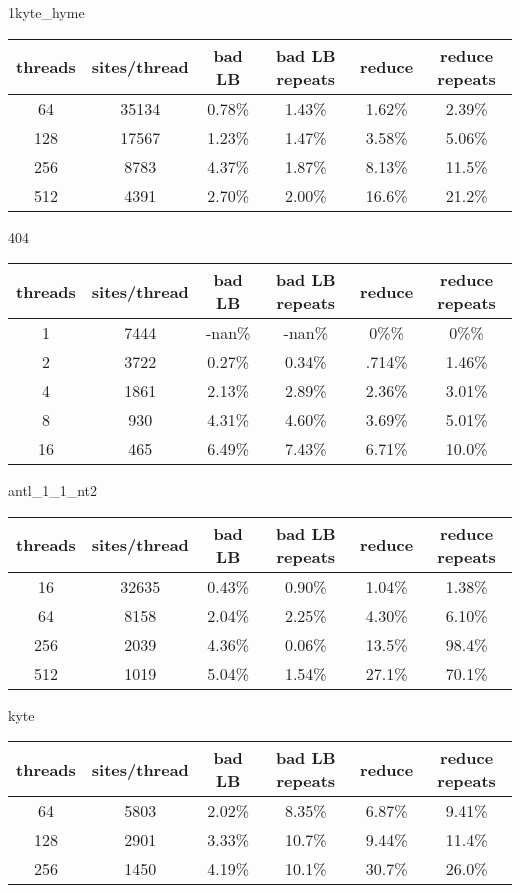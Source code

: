 \documentclass[a4paper]{article}
\begin{document}
1kyte\_hyme

\begin{tabular}{|c|c|c|c|c|c|}
\hline threads & sites/thread & bad LB & bad LB repeats & reduce & reduce repeats \\
\hline 64 & 35134 & 0.78\% & 1.43\% & 1.62\% & 2.39\% \\
\hline 128 & 17567 & 1.23\% & 1.47\% & 3.58\% & 5.06\% \\
\hline 256 & 8783 & 4.37\% & 1.87\% & 8.13\% & 11.5\% \\
\hline 512 & 4391 & 2.70\% & 2.00\% & 16.6\% & 21.2\% \\
\hline
\end{tabular}
\newline

404

\begin{tabular}{|c|c|c|c|c|c|}
\hline threads & sites/thread & bad LB & bad LB repeats & reduce & reduce repeats \\
\hline 1 & 7444 & -nan\% & -nan\% & 0\%\% & 0\%\% \\
\hline 2 & 3722 & 0.27\% & 0.34\% & .714\% & 1.46\% \\
\hline 4 & 1861 & 2.13\% & 2.89\% & 2.36\% & 3.01\% \\
\hline 8 & 930 & 4.31\% & 4.60\% & 3.69\% & 5.01\% \\
\hline 16 & 465 & 6.49\% & 7.43\% & 6.71\% & 10.0\% \\
\hline
\end{tabular}
\newline

antl\_1\_1\_nt2

\begin{tabular}{|c|c|c|c|c|c|}
\hline threads & sites/thread & bad LB & bad LB repeats & reduce & reduce repeats \\
\hline 16 & 32635 & 0.43\% & 0.90\% & 1.04\% & 1.38\% \\
\hline 64 & 8158 & 2.04\% & 2.25\% & 4.30\% & 6.10\% \\
\hline 256 & 2039 & 4.36\% & 0.06\% & 13.5\% & 98.4\% \\
\hline 512 & 1019 & 5.04\% & 1.54\% & 27.1\% & 70.1\% \\
\hline
\end{tabular}
\newline

kyte

\begin{tabular}{|c|c|c|c|c|c|}
\hline threads & sites/thread & bad LB & bad LB repeats & reduce & reduce repeats \\
\hline 64 & 5803 & 2.02\% & 8.35\% & 6.87\% & 9.41\% \\
\hline 128 & 2901 & 3.33\% & 10.7\% & 9.44\% & 11.4\% \\
\hline 256 & 1450 & 4.19\% & 10.1\% & 30.7\% & 26.0\% \\
\hline
\end{tabular}
\newline
\end{document}
